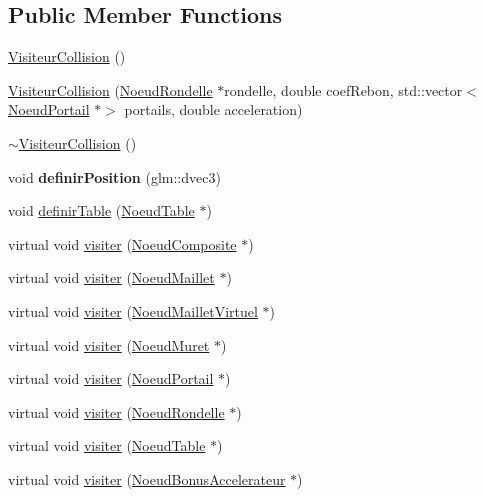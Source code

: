 \subsection*{Public Member Functions}
\begin{DoxyCompactItemize}
\item 
\hyperlink{group__inf2990_gadb7d5f275d9cf6cd9e9d74986058e700}{Visiteur\+Collision} ()
\item 
\hyperlink{group__inf2990_ga9383225a11bc84f3d5f3230b38df0d1f}{Visiteur\+Collision} (\hyperlink{class_noeud_rondelle}{Noeud\+Rondelle} $\ast$rondelle, double coef\+Rebon, std\+::vector$<$ \hyperlink{class_noeud_portail}{Noeud\+Portail} $\ast$$>$ portails, double acceleration)
\item 
\hyperlink{group__inf2990_ga92543e88d42df4f030c7e98737628d9a}{$\sim$\+Visiteur\+Collision} ()
\item 
void {\bfseries definir\+Position} (glm\+::dvec3)
\item 
void \hyperlink{group__inf2990_ga6bfba4fbee3a89120e5f78bdcccf535d}{definir\+Table} (\hyperlink{class_noeud_table}{Noeud\+Table} $\ast$)
\item 
virtual void \hyperlink{group__inf2990_ga60a7af24c85b42f39bdb9cf22b213f03}{visiter} (\hyperlink{class_noeud_composite}{Noeud\+Composite} $\ast$)
\item 
virtual void \hyperlink{group__inf2990_gab5a50a3f4a1b1658eb0106a1f455fbaa}{visiter} (\hyperlink{class_noeud_maillet}{Noeud\+Maillet} $\ast$)
\item 
virtual void \hyperlink{group__inf2990_ga598b2bec9120bdc329721c94bb89b2b1}{visiter} (\hyperlink{class_noeud_maillet_virtuel}{Noeud\+Maillet\+Virtuel} $\ast$)
\item 
virtual void \hyperlink{group__inf2990_ga9a87666874976c2354ae6008c5d295ed}{visiter} (\hyperlink{class_noeud_muret}{Noeud\+Muret} $\ast$)
\item 
virtual void \hyperlink{group__inf2990_ga0dddecba0e89904757fca3d9081d678f}{visiter} (\hyperlink{class_noeud_portail}{Noeud\+Portail} $\ast$)
\item 
virtual void \hyperlink{group__inf2990_gad679b2bdfe4bc0105ff638ddb5f447cc}{visiter} (\hyperlink{class_noeud_rondelle}{Noeud\+Rondelle} $\ast$)
\item 
virtual void \hyperlink{group__inf2990_gab071b0f0b2d05d622c4698a652f19e77}{visiter} (\hyperlink{class_noeud_table}{Noeud\+Table} $\ast$)
\item 
virtual void \hyperlink{group__inf2990_ga9e56b43c1b38d5d4d08283d28b9dbcf2}{visiter} (\hyperlink{class_noeud_bonus_accelerateur}{Noeud\+Bonus\+Accelerateur} $\ast$)
$$
\end{DoxyCompactItemize}

